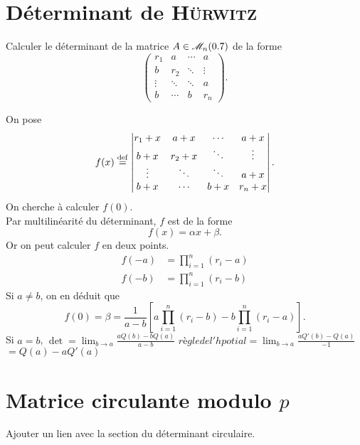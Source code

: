 \section{Déterminant de \textsc{Hürwitz}}
\begin{exercice}
    Calculer le déterminant de la matrice $A \in \mathscr{M}_n(0.7)$ de la forme
    $$
    \begin{pmatrix}
        r_1 & a & \cdots & a \\
        b & r_2 & \ddots & \vdots \\
        \vdots & \ddots & \ddots & a \\
        b & \cdots & b & r_n
    \end{pmatrix}.
    $$
\end{exercice}

\begin{solution}
    On pose 
    $$
    f(x) \overset{\mathrm{\tiny def}}{=}
    \begin{vmatrix}
        r_1 + x & a + x & \cdots & a + x\\
        b + x & r_2 + x & \ddots & \vdots \\
        \vdots & \ddots & \ddots & a + x \\
        b + x & \cdots & b + x & r_n + x
    \end{vmatrix}.
    $$
    On cherche à calculer $f(0)$. \\   
    Par multilinéarité du déterminant, $f$ est de la forme
    $$f(x) = \alpha x + \beta.$$
    Or on peut calculer $f$ en deux points.
    \begin{align*}
        f(-a) &= \prod_{i=1}^n (r_i - a) \\
        f(-b) &= \prod_{i=1}^n (r_i - b) 
    \end{align*}
    Si $a \not= b$, on en déduit que 
    $$f(0) = \beta = \frac{1}{a-b} \left[ a \prod\limits_{i=1}^n (r_i - b) - b \prod\limits_{i=1}^n (r_i - a) \right].$$
    Si $a = b$, 
    $\det = \lim_{b \to a} \frac{a Q(b) - b Q(a)}{a-b}$
    $règle de l'hpotial = \lim_{b \to a} \frac{a Q'(b) - Q(a)}{-1}$
    $ = Q(a) - a Q'(a)$
\end{solution}

\section{Matrice circulante modulo \texorpdfstring{$p$}{p}}

Ajouter un lien avec la section du déterminant circulaire. 


